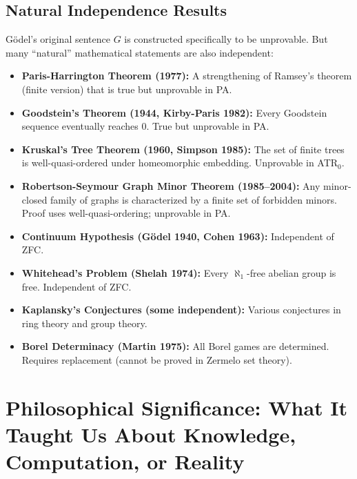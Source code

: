 \subsection*{Natural Independence Results}

Gödel's original sentence $G$ is constructed specifically to be unprovable. But many ``natural'' mathematical statements are also independent:

\begin{itemize}
\item \textbf{Paris-Harrington Theorem (1977):} A strengthening of Ramsey's theorem (finite version) that is true but unprovable in PA.
\item \textbf{Goodstein's Theorem (1944, Kirby-Paris 1982):} Every Goodstein sequence eventually reaches 0. True but unprovable in PA.
\item \textbf{Kruskal's Tree Theorem (1960, Simpson 1985):} The set of finite trees is well-quasi-ordered under homeomorphic embedding. Unprovable in ATR$_0$.
\item \textbf{Robertson-Seymour Graph Minor Theorem (1985--2004):} Any minor-closed family of graphs is characterized by a finite set of forbidden minors. Proof uses well-quasi-ordering; unprovable in PA.
\item \textbf{Continuum Hypothesis (Gödel 1940, Cohen 1963):} Independent of ZFC.
\item \textbf{Whitehead's Problem (Shelah 1974):} Every $\aleph_1$-free abelian group is free. Independent of ZFC.
\item \textbf{Kaplansky's Conjectures (some independent):} Various conjectures in ring theory and group theory.
\item \textbf{Borel Determinacy (Martin 1975):} All Borel games are determined. Requires replacement (cannot be proved in Zermelo set theory).
\end{itemize}

\section{Philosophical Significance: What It Taught Us About Knowledge, Computation, or Reality}
\label{sec:godel:philosophy}

